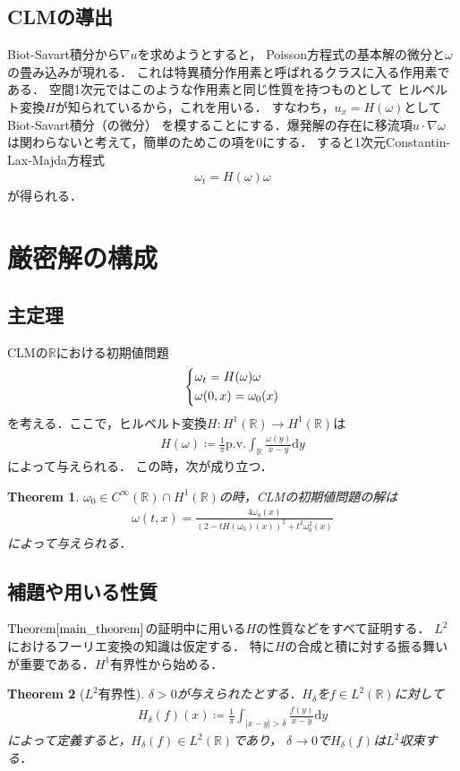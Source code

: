 \documentclass[dvipdfmx,autodetect-engine]{jsarticle}
\newtheorem{theorem}{Theorem}[section]
\theoremstyle{remark}
\theoremstyle{definition}
\newcommand{\R}{\mathbb{R}}
\begin{document}
\subsection{CLMの導出}
Biot-Savart積分から$\nabla u$を求めようとすると，
Poisson方程式の基本解の微分と$\omega$の畳み込みが現れる．
これは特異積分作用素と呼ばれるクラスに入る作用素である．
空間1次元ではこのような作用素と同じ性質を持つものとして
ヒルベルト変換$H$が知られているから，これを用いる．
すなわち，$u_x = H(\omega)$としてBiot-Savart積分（の微分）
を模することにする．爆発解の存在に移流項$u\cdot \nabla \omega$
は関わらないと考えて，簡単のためこの項を0にする．
すると1次元Constantin-Lax-Majda方程式
\begin{align}
    \omega_t = H(\omega)\omega 
\end{align}
が得られる．
\section{厳密解の構成}
\subsection{主定理}
CLMの$\R$における初期値問題
\begin{align}
    \begin{dcases}
        \omega_t = H(\omega)\omega \\
        \omega(0,x) = \omega_0(x)
    \end{dcases}
\end{align}
を考える．ここで，ヒルベルト変換$H:H^1(\R)\to H^1(\R)$は
\begin{align}
    H(\omega) \coloneqq \frac{1}{\pi} \mathrm{p.v.} \int_{\R} \frac{\omega(y)}{x-y} \mathrm{d}y
\end{align}
によって与えられる．
この時，次が成り立つ．
\begin{theorem}\label{main_theorem}
    $\omega_0 \in C^{\infty}(\R) \cap H^{1}(\R)$の時，CLMの初期値問題の解は
    \begin{align}
        \omega (t,x) = \frac{4\omega_0 (x)}{(2-tH(\omega_0)(x))^2 + t^2 \omega_0^2(x)}
    \end{align}
    によって与えられる．
\end{theorem}

\subsection{補題や用いる性質}
$\mathrm{Theorem} \ref{main_theorem}$の証明中に用いる$H$の性質などをすべて証明する．
$L^2$におけるフーリエ変換の知識は仮定する．
特に$H$の合成と積に対する振る舞いが重要である．$H^1$有界性から始める．
\begin{theorem}[$L^2$有界性]
    $\delta >0$が与えられたとする．$H_{\delta}$を$f \in L^2 (\R)$に対して
    \begin{align}
        H_{\delta} (f) (x) \coloneqq \frac{1}{\pi} \int_{\lvert x-y \rvert > \delta} 
        \frac{f(y)}{x-y} \mathrm{d}y
    \end{align}
    によって定義すると，$H_{\delta}(f) \in L^2(\R)$であり，
    $\delta \to 0$で$H_{\delta}(f)$は$L^2$収束する．
\end{theorem}
\end{document}
